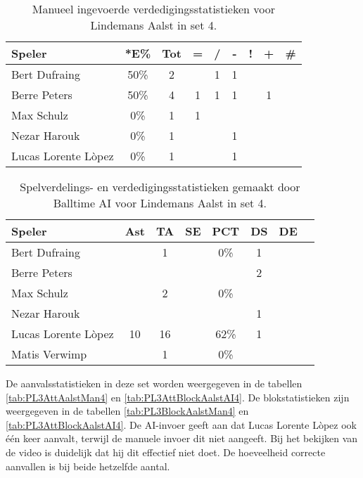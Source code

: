 \begin{table}[ht!]
    \centering
    \scriptsize
    \begin{tabular}{|l|c|c|c|c|c|c|c|c|}
        \hline
        \textbf{Speler} & *E\% & Tot & = & / & - & ! & + & \# \\ \hline
        Bert Dufraing & 50\% & 2 &  & 1 & 1 &  &  & \\ 
        Berre Peters & 50\% & 4 & 1 & 1 & 1 & & 1 &  \\ 
        Max Schulz & 0\% & 1 & 1 &  &  &  &  & \\ 
        Nezar Harouk & 0\% & 1 &  &  & 1 &  &  &  \\ 
        Lucas Lorente Lòpez & 0\% & 1 &  &  & 1 &  &  & \\ \hline
    \end{tabular}
    \caption[Manueel ingevoerde verdedigingsstatistieken voor Lindemans Aalst in set 4]{\label{tab:PL3DigAalstMan4}Manueel ingevoerde verdedigingsstatistieken voor Lindemans Aalst in set 4.}
\end{table}

\begin{table}[ht!]
  \centering
  \scriptsize
  \begin{tabular}{|l|c|c|c|c|c|c|c|} \hline
    \textbf{Speler} & Ast & TA & SE & PCT & DS &  DE \\ \hline
    Bert Dufraing &  & 1 &  & 0\% & 1 &  \\
    Berre Peters &   &   &   &   & 2 &   \\
    Max Schulz &  & 2 &  & 0\% &   &   \\
    Nezar Harouk &   &   &   &   &  1 &   \\
    Lucas Lorente Lòpez & 10 & 16 &  & 62\% & 1 &  \\
    Matis Verwimp &  & 1 & & 0\% &   &   \\ \hline
  \end{tabular}
 \caption[Spelverdelings- en verdedigingsstatistieken gemaakt door Balltime AI voor Lindemans Aalst in set 4]{\label{tab:PL3SetDigAalstAI4}Spelverdelings- en verdedigingsstatistieken gemaakt door Balltime AI voor Lindemans Aalst in set 4.}
\end{table}

De aanvalsstatistieken in deze set worden weergegeven in de tabellen \ref{tab:PL3AttAalstMan4} en \ref{tab:PL3AttBlockAalstAI4}. De blokstatistieken zijn weergegeven in de tabellen \ref{tab:PL3BlockAalstMan4} en \ref{tab:PL3AttBlockAalstAI4}. De AI-invoer geeft aan dat Lucas Lorente Lòpez ook één keer aanvalt, terwijl de manuele invoer dit niet aangeeft. Bij het bekijken van de video is duidelijk dat hij dit effectief niet doet. De hoeveelheid correcte aanvallen is bij beide hetzelfde aantal.

